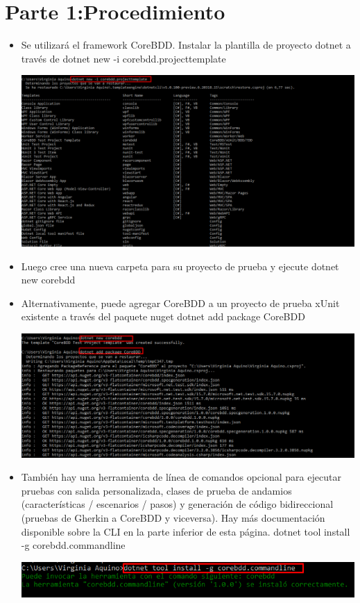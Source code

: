 \section{Parte 1:Procedimiento} 
\begin{itemize}
 \item Se utilizará el framework CoreBDD. Instalar la plantilla de proyecto dotnet a través de
 dotnet new -i corebdd.projecttemplate
\begin{center}
\includegraphics[width=\columnwidth]{images/1}\newline
\end{center}

\item Luego cree una nueva carpeta para su proyecto de prueba y ejecute
 dotnet new corebdd
\item Alternativamente, puede agregar CoreBDD a un proyecto de prueba xUnit existente a través del paquete
nuget
 dotnet add package CoreBDD
\begin{center}
\includegraphics[width=\columnwidth]{images/2}\newline
\end{center}
\item También hay una herramienta de línea de comandos opcional para ejecutar pruebas con salida
personalizada, clases de prueba de andamios (características / escenarios / pasos) y generación de código
bidireccional (pruebas de Gherkin a CoreBDD y viceversa). Hay más documentación disponible sobre la CLI
en la parte inferior de esta página.
 dotnet tool install -g corebdd.commandline

\begin{center}
\includegraphics[width=\columnwidth]{images/3}\newline
\end{center}

\end{itemize}
